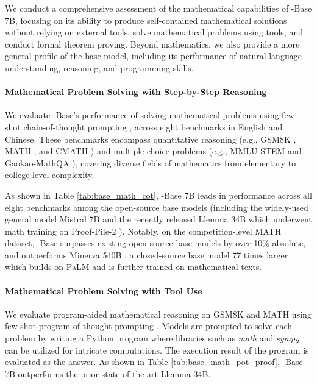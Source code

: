 We conduct a comprehensive assessment of the mathematical capabilities of \spmath-Base 7B, focusing on its ability to produce self-contained mathematical solutions without relying on external tools, solve mathematical problems using tools, and conduct formal theorem proving.
Beyond mathematics, we also provide a more general profile of the base model, including its performance of natural language understanding, reasoning, and programming skills.

\paragraph{Mathematical Problem Solving with Step-by-Step Reasoning}

We evaluate \spmath-Base's performance of solving mathematical problems using few-shot chain-of-thought prompting \citep{cot}, across eight benchmarks in English and Chinese.
These benchmarks encompass quantitative reasoning (e.g., GSM8K \citep{gsm8k}, MATH \citep{MATH}, and CMATH \citep{wei2023cmath}) and multiple-choice problems (e.g., MMLU-STEM \citep{mmlu} and Gaokao-MathQA \citep{agieval}), covering diverse fields of mathematics from elementary to college-level complexity.

As shown in Table \ref{tab:base_math_cot}, \spmath-Base 7B leads in performance across all eight benchmarks among the open-source base models (including the widely-used general model Mistral 7B \citep{mistral} and the recently released Llemma 34B \citep{llemma} which underwent math training on Proof-Pile-2 \citep{llemma}).
Notably, on the competition-level MATH dataset, \spmath-Base surpasses existing open-source base models by over 10\% absolute, and outperforms Minerva 540B \citep{minerva}, a closed-source base model 77 times larger which builds on PaLM \citep{palm} and is further trained on mathematical texts.

\begingroup
\setlength{\tabcolsep}{3pt} 
\renewcommand{\arraystretch}{1} 

\endgroup

\paragraph{Mathematical Problem Solving with Tool Use}
We evaluate program-aided mathematical reasoning on GSM8K and MATH using few-shot program-of-thought prompting \citep{pot,pal}.
Models are prompted to solve each problem by writing a Python program where libraries such as \textit{math} and \textit{sympy} can be utilized for intricate computations.
The execution result of the program is evaluated as the answer.
As shown in Table \ref{tab:base_math_pot_proof}, \spmath-Base 7B outperforms the prior state-of-the-art Llemma 34B.

